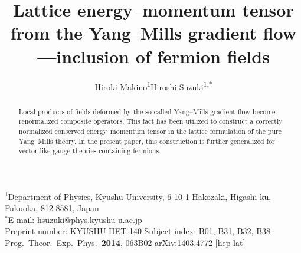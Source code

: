 \documentclass[11pt]{article}
\title{Lattice energy--momentum tensor from the Yang--Mills gradient flow---inclusion of fermion fields}
\author{Hiroki Makino\textsuperscript{1}\qquad Hiroshi Suzuki\textsuperscript{1,$\ast$}}
\date{}
\numberwithin{equation}{section}
\begin{document}
\maketitle

\begin{abstract}
Local products of fields deformed by the so-called Yang--Mills gradient flow
become renormalized composite operators. This fact has been utilized to
construct a correctly normalized conserved energy--momentum tensor in the
lattice formulation of the pure Yang--Mills theory. In the present paper, this
construction is further generalized for vector-like gauge theories containing
fermions.
\end{abstract}

\begin{center}\small
\textsuperscript{1}Department of Physics, Kyushu University, 6-10-1 Hakozaki,
Higashi-ku, Fukuoka, 812-8581, Japan\\
$^{\ast}$E-mail: hsuzuki@phys.kyushu-u.ac.jp\\[2pt]
Preprint number: KYUSHU-HET-140 \quad Subject index: B01, B31, B32, B38\\
Prog.\ Theor.\ Exp.\ Phys.\ \textbf{2014}, 063B02 \quad arXiv:1403.4772 [hep-lat]
\end{center}








\end{document}
